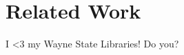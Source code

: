 \section{Related Work}   \label{chap:relatedWork}

I <3 my Wayne State Libraries! Do you? \cite{WSULibrary}





